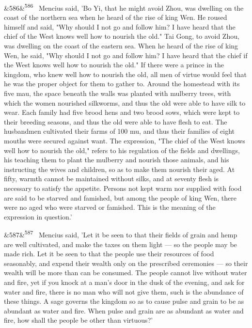 \documentclass[12pt]{article}
\newcommand{\para}[1][]{\par\noindent\ifx&#1&\else\textsuperscript{\footnotesize #1}~\fi}
\begin{document}
\para[586] Mencius said, 'Bo Yi, that he might avoid Zhou, was dwelling on the coast of the northern sea when he heard of the rise of king Wen. He roused himself and said, "Why should I not go and follow him? I have heard that the chief of the West knows well how to nourish the old." Tai Gong, to avoid Zhou, was dwelling on the coast of the eastern sea. When he heard of the rise of king Wen, he said, "Why should I not go and follow him? I have heard that the chief if the West knows well how to nourish the old." If there were a prince in the kingdom, who knew well how to nourish the old, all men of virtue would feel that he was the proper object for them to gather to. Around the homestead with its five mau, the space beneath the walls was planted with mulberry trees, with which the women nourished silkworms, and thus the old were able to have silk to wear. Each family had five brood hens and two brood sows, which were kept to their breeding seasons, and thus the old were able to have flesh to eat. The husbandmen cultivated their farms of 100 mu, and thus their families of eight mouths were secured against want. The expression, "The chief of the West knows well how to nourish the old," refers to his regulation of the fields and dwellings, his teaching them to plant the mulberry and nourish those animals, and his instructing the wives and children, so as to make them nourish their aged. At fifty, warmth cannot be maintained without silks, and at seventy flesh is necessary to satisfy the appetite. Persons not kept warm nor supplied with food are said to be starved and famished, but among the people of king Wen, there were no aged who were starved or famished. This is the meaning of the expression in question.'

\para[587] Mencius said, 'Let it be seen to that their fields of grain and hemp are well cultivated, and make the taxes on them light --- so the people may be made rich. Let it be seen to that the people use their resources of food seasonably, and expend their wealth only on the prescribed ceremonies --- so their wealth will be more than can be consumed. The people cannot live without water and fire, yet if you knock at a man's door in the dusk of the evening, and ask for water and fire, there is no man who will not give them, such is the abundance of these things. A sage governs the kingdom so as to cause pulse and grain to be as abundant as water and fire. When pulse and grain are as abundant as water and fire, how shall the people be other than virtuous?'
\end{document}
